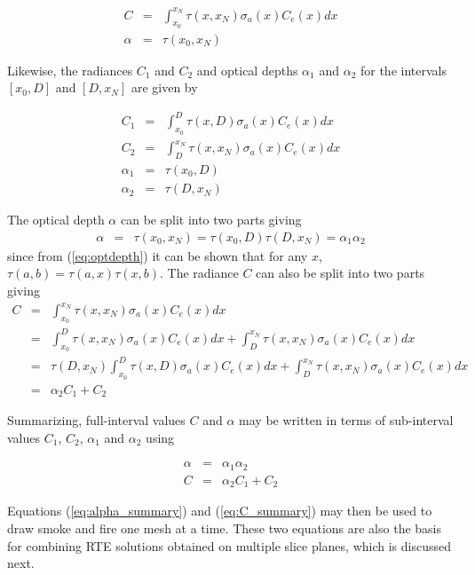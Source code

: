 {\begin{eqnarray*}
C&=&\int_{x_0}^{x_N}\tau(x,x_N)\sigma_a(x)C_e(x)dx\\
\alpha&=&\tau(x_0,x_N)
\end{eqnarray*}

Likewise, the radiances $C_1$ and $C_2$ and optical depths $\alpha_1$ and $\alpha_2$ for the intervals $[x_0,D]$ and $[D,x_N]$ are given by

\begin{eqnarray*}
C_1&=&\int_{x_0}^{D}\tau(x,D)\sigma_a(x)C_e(x)dx\\
C_2&=&\int_{D}^{x_N}\tau(x,x_N)\sigma_a(x)C_e(x)dx\\
\alpha_1&=&\tau(x_0,D)\\
\alpha_2&=&\tau(D,x_N)
\end{eqnarray*}

The optical depth $\alpha$ can be split into two parts giving
\begin{eqnarray*}
\alpha&=&\tau(x_0,x_N)=\tau(x_0,D)\tau(D,x_N)=\alpha_1\alpha_2
\end{eqnarray*}
since from (\ref{eq:optdepth}) it can be shown that for any $x$, $\tau(a,b)=\tau(a,x)\tau(x,b)$.
The radiance $C$ can also be split into two parts giving
\begin{eqnarray*}
C&=&\int_{x_0}^{x_N}\tau(x,x_N)\sigma_a(x)C_e(x)dx\\
&=&\int_{x_0}^{D}\tau(x,x_N)\sigma_a(x)C_e(x)dx+\int_{D}^{x_N}\tau(x,x_N)\sigma_a(x)C_e(x)dx\\
&=&\tau(D,x_N)\int_{x_0}^{D}\tau(x,D)\sigma_a(x)C_e(x)dx+\int_{D}^{x_N}\tau(x,x_N)\sigma_a(x)C_e(x)dx\\
&=&\alpha_2C_1+C_2
\end{eqnarray*}

Summarizing, full-interval values $C$ and $\alpha$ may be written in terms of sub-interval values $C_1$, $C_2$, $\alpha_1$ and $\alpha_2$ using

\begin{eqnarray}
\label{eq:alpha_summary}
\alpha&=&\alpha_1\alpha_2\\
\label{eq:C_summary}
C&=&\alpha_2C_1+C_2
\end{eqnarray}

Equations (\ref{eq:alpha_summary}) and (\ref{eq:C_summary}) may then be used to draw smoke and fire one mesh at a time.  These two equations are also the basis for combining RTE solutions obtained on multiple slice planes, which is discussed next.


}
